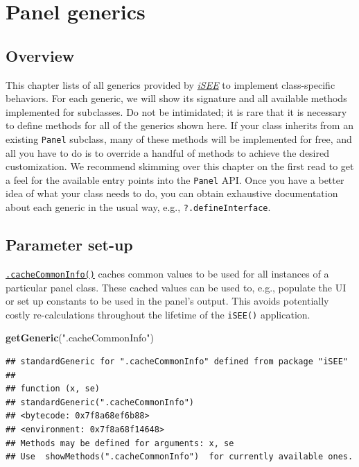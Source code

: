 \documentclass[
]{book}
\newenvironment{Shaded}{\begin{snugshade}}{\end{snugshade}}
\newcommand{\KeywordTok}[1]{\textcolor[rgb]{0.13,0.29,0.53}{\textbf{#1}}}
\newcommand{\NormalTok}[1]{#1}
\newcommand{\StringTok}[1]{\textcolor[rgb]{0.31,0.60,0.02}{#1}}
\begin{document}
\hypertarget{api}{%
\chapter{Panel generics}\label{api}}

\hypertarget{overview}{%
\section{Overview}\label{overview}}

This chapter lists of all generics provided by \emph{\href{https://bioconductor.org/packages/3.11/iSEE}{iSEE}} to implement class-specific behaviors.
For each generic, we will show its signature and all available methods implemented for subclasses.
Do not be intimidated; it is rare that it is necessary to define methods for all of the generics shown here.
If your class inherits from an existing \texttt{Panel} subclass, many of these methods will be implemented for free, and all you have to do is to override a handful of methods to achieve the desired customization.
We recommend skimming over this chapter on the first read to get a feel for the available entry points into the \texttt{Panel} API.
Once you have a better idea of what your class needs to do, you can obtain exhaustive documentation about each generic in the usual way, e.g., \texttt{?.defineInterface}.

\hypertarget{parameter-set-up}{%
\section{Parameter set-up}\label{parameter-set-up}}

\href{https://isee.github.io/iSEE/reference/setup-generics.html}{\texttt{.cacheCommonInfo()}} caches common values to be used for all instances of a particular panel class.
These cached values can be used to, e.g., populate the UI or set up constants to be used in the panel's output.
This avoids potentially costly re-calculations throughout the lifetime of the \texttt{iSEE()} application.

\begin{Shaded}
\begin{Highlighting}[]
\KeywordTok{getGeneric}\NormalTok{(}\StringTok{".cacheCommonInfo"}\NormalTok{)}
\end{Highlighting}
\end{Shaded}

\begin{verbatim}
## standardGeneric for ".cacheCommonInfo" defined from package "iSEE"
## 
## function (x, se) 
## standardGeneric(".cacheCommonInfo")
## <bytecode: 0x7f8a68ef6b88>
## <environment: 0x7f8a68f14648>
## Methods may be defined for arguments: x, se
## Use  showMethods(".cacheCommonInfo")  for currently available ones.
\end{verbatim}
\end{document}
